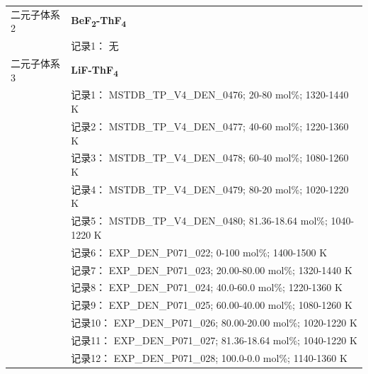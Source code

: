 \documentclass[12pt]{article}
\begin{document}
{\begin{longtable}[]{@{}
  >{\raggedright\arraybackslash}p{}
  >{\raggedright\arraybackslash}p{}@{}}
二元子体系 2 & \textbf{BeF\textsubscript{2}-ThF\textsubscript{4}} \\
 & 记录1： 无 \\
二元子体系 3  & \textbf{LiF-ThF\textsubscript{4}} \\
 & 记录1： MSTDB\_TP\_V4\_DEN\_0476; 20-80 mol\%; 1320-1440 K \\
 & 记录2： MSTDB\_TP\_V4\_DEN\_0477; 40-60 mol\%; 1220-1360 K \\
 & 记录3： MSTDB\_TP\_V4\_DEN\_0478; 60-40 mol\%; 1080-1260 K \\
 & 记录4： MSTDB\_TP\_V4\_DEN\_0479; 80-20 mol\%; 1020-1220 K \\
 & 记录5： MSTDB\_TP\_V4\_DEN\_0480; 81.36-18.64 mol\%; 1040-1220 K \\
 & 记录6： EXP\_DEN\_P071\_022; 0-100 mol\%; 1400-1500 K \\
 & 记录7： EXP\_DEN\_P071\_023; 20.00-80.00 mol\%; 1320-1440 K \\
 & 记录8： EXP\_DEN\_P071\_024; 40.0-60.0 mol\%; 1220-1360 K \\
 & 记录9： EXP\_DEN\_P071\_025; 60.00-40.00 mol\%; 1080-1260 K \\
 & 记录10： EXP\_DEN\_P071\_026; 80.00-20.00 mol\%; 1020-1220 K \\
 & 记录11： EXP\_DEN\_P071\_027; 81.36-18.64 mol\%; 1040-1220 K \\
 & 记录12： EXP\_DEN\_P071\_028; 100.0-0.0 mol\%; 1140-1360 K  \\


\end{longtable}}
\end{document}
